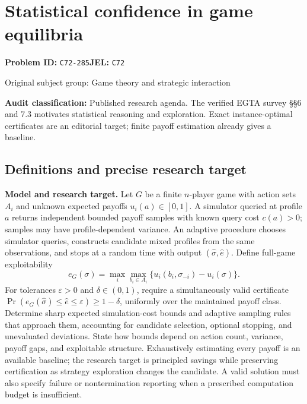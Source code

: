 \documentclass[11pt,a4paper]{article}
\begin{document}
\section*{Statistical confidence in game equilibria}
\textbf{Problem ID:} \texttt{C72-285}\quad \textbf{JEL:} \texttt{C72}\par
\label{problem:OP-0288}
{\sffamily\small\color{muted}Original subject group: Game theory and strategic interaction\par}
\label{definitions:problem:30007570}
\textbf{Audit classification:} Published research agenda. The verified EGTA survey §§6 and 7.3 motivates statistical reasoning and exploration. Exact instance-optimal certificates are an editorial target; finite payoff estimation already gives a baseline.
\subsection*{Definitions and precise research target}
\textbf{Model and research target.} Let \(G\) be a finite \(n\)-player game with action sets \(A_i\) and unknown expected payoffs \(u_i(a)\in[0,1]\). A simulator queried at profile \(a\) returns independent bounded payoff samples with known query cost \(c(a)>0\); samples may have profile-dependent variance. An adaptive procedure chooses simulator queries, constructs candidate mixed profiles from the same observations, and stops at a random time with output \((\widehat\sigma,\widehat e)\). Define full-game exploitability
\[
 e_G(\sigma)=\max_i\max_{b_i\in A_i}
 \{u_i(b_i,\sigma_{-i})-u_i(\sigma)\}.
\]
For tolerances \(\varepsilon>0\) and \(\delta\in(0,1)\), require a simultaneously valid certificate \(\Pr(e_G(\widehat\sigma)\leq\widehat e\leq\varepsilon)\geq1-\delta\), uniformly over the maintained payoff class. Determine sharp expected simulation-cost bounds and adaptive sampling rules that approach them, accounting for candidate selection, optional stopping, and unevaluated deviations. State how bounds depend on action count, variance, payoff gaps, and exploitable structure. Exhaustively estimating every payoff is an available baseline; the research target is principled savings while preserving certification as strategy exploration changes the candidate. A valid solution must also specify failure or nontermination reporting when a prescribed computation budget is insufficient.
\end{document}
